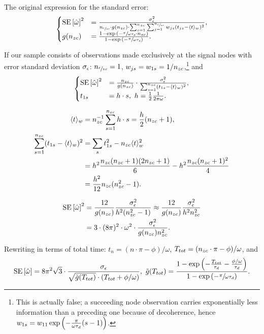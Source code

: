 \documentclass[14pt]{article}
\begin{document}
The original expression for the standard error:	
\begin{equation}
\begin{cases}
		\SE{\hat{\omega}}^2 &= \frac{\SD{\obs}^2}{\Nozc\cdot g(\Nzc)\cdot \sum_{s=1}^{\Nzc}\sum_{j=1}^{\Nozc} w_{js} (t_{js} - \avg{t}_w)^2}, \\
		g(\Nzc) &= \frac{1-\exp{(-\sfrac{\pi}{\omega\tau_d}\cdot \Nzc)}}{1 - \exp{(-\sfrac{\pi}{\omega\tau_d})}}.
\end{cases}
\end{equation}
	
If our sample consists of observations made exclusively at the signal nodes with error standard deviation $\SD{\obs}$: $n_{\sfrac{\epsilon}{zc}} = 1$, $w_{js} = w_{1s} = 1/n_{zc}$,\footnote{This is actually false; a succeeding node observation carries exponentially less information than a preceding one because of decoherence, hence $w_{1s} = w_{11}\exp\bkt{-\frac{\pi}{\omega\tau_d}(s-1)}$.} and
\begin{equation}
	\begin{cases}
	\SE{\hat{\omega}}^2 &= \frac{\Nzc}{g(\Nzc)}\cdot \frac{\SD{\obs}^2}{\sum_{s=1}^{\Nzc}(t_{1s} - \avg{t}_w)^2}, \\
	t_{1s} &= h\cdot s, ~ h = \frac{1}{2}\frac{1}{2\pi\omega}.
	\end{cases}
\end{equation}

\begin{align*}
	\langle t\rangle_w &= n_{zc}^{-1}\sum_{s=1}^{n_{zc}}h\cdot s = \frac{h}{2}(n_{zc}+1), \\
	\sum_{s=1}^{n_{zc}}(t_{1s} - \langle t\rangle_w)^2 &= \sum_s t_{1s}^2 - n_{zc}\langle t\rangle_w^2 \\
			&= h^2\frac{n_{zc}(n_{zc}+1)(2n_{zc}+1)}{6} - h^2\frac{n_{zc}(n_{zc}+1)^2}{4} \\
			&= \frac{h^2}{12}n_{zc}(n_{zc}^2-1).
\end{align*}
	
\begin{align}
	\SE{\hat{\omega}}^2 &= \frac{12}{g(\Nzc)}\frac{\SD{\obs}^2}{h^2(\Nzc^2-1)} \approx \frac{12}{g(\Nzc)}\frac{\SD{\obs}^2}{h^2\Nzc^2} \notag \\
		&= 3\cdot(8\pi)^2\cdot \omega^2\cdot \frac{\SD{\obs}^2}{g(\Nzc)\Nzc^2}.
\end{align}

Rewriting in terms of total time: $t_n = (n\cdot\pi - \phi)/\omega$, $T_{tot} = (n_{zc}\cdot\pi-\phi)/\omega$, and
\begin{equation}
	\SE{\hat{\omega}} = 8\pi^2\sqrt{3}\cdot\frac{\SD{\obs}}{\sqrt{\tilde{g}(T_{tot})}\cdot\bkt{T_{tot} + \phi/\omega}}, ~ \tilde{g}(T_{tot}) = \frac{1-\exp{\bkt{-\frac{T_{tot}}{\tau_d} - \frac{\phi/\omega}{\tau_d}}}}{1-\exp{(-\sfrac{\pi}{\omega\tau_d})}}.
\end{equation}
\end{document}
